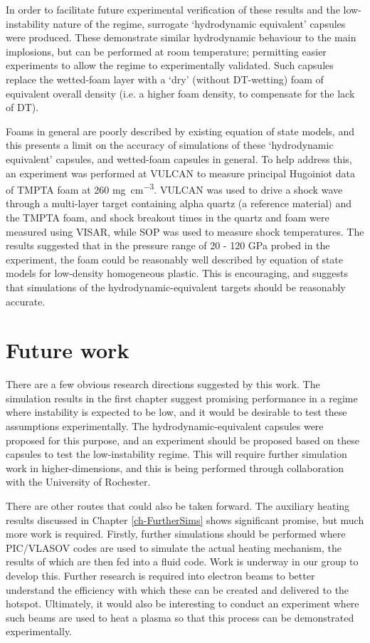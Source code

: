 In order to facilitate future experimental verification of these results and the low-instability nature of the regime, surrogate `hydrodynamic equivalent' capsules were produced. These demonstrate similar hydrodynamic behaviour to the main implosions, but can be performed at room temperature; permitting easier experiments to allow the regime to experimentally validated. Such capsules replace the wetted-foam layer with a `dry' (without DT-wetting) foam of equivalent overall density (i.e. a higher foam density, to compensate for the lack of DT).

Foams in general are poorly described by existing equation of state models, and this presents a limit on the accuracy of simulations of these `hydrodynamic equivalent' capsules, and wetted-foam capsules in general. To help address this, an experiment was performed at VULCAN to measure principal Hugoiniot data of TMPTA foam at 260 \unit{\milli\gram\per\centi\meter\cubed}. VULCAN was used to drive a shock wave through a multi-layer target containing alpha quartz (a reference material) and the TMPTA foam, and shock breakout times in the quartz and foam were measured using VISAR, while SOP was used to measure shock temperatures. The results suggested that in the pressure range of 20 - 120 \unit{\giga\pascal} probed in the experiment, the foam could be reasonably well described by equation of state models for low-density homogeneous plastic. This is encouraging, and suggests that simulations of the hydrodynamic-equivalent targets should be reasonably accurate.

\section{Future work}
There are a few obvious research directions suggested by this work. The simulation results in the first chapter suggest promising performance in a regime where instability is expected to be low, and it would be desirable to test these assumptions experimentally. The hydrodynamic-equivalent capsules were proposed for this purpose, and an experiment should be proposed based on these capsules to test the low-instability regime. This will require further simulation work in higher-dimensions, and this is being performed through collaboration with the University of Rochester. 

There are other routes that could also be taken forward. The auxiliary heating results discussed in Chapter \ref{ch-FurtherSims} shows significant promise, but much more work is required. Firstly, further simulations should be performed where PIC/VLASOV codes are used to simulate the actual heating mechanism, the results of which are then fed into a fluid code. Work is underway in our group to develop this. Further research is required into electron beams to better understand the efficiency with which these can be created and delivered to the hotspot. Ultimately, it would also be interesting to conduct an experiment where such beams are used to heat a plasma so that this process can be demonstrated experimentally.

